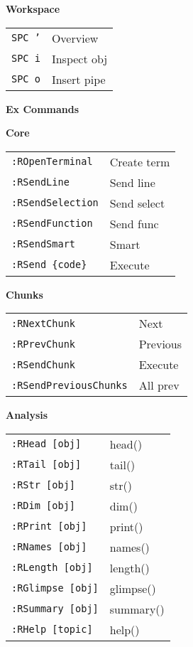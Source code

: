 \documentclass[10pt,a4paper]{article}
\begin{document}
\begin{multicols}{3}
\vspace{3pt}
\textbf{Workspace}\\
\begin{tabular}{@{}L{0.6cm}L{1.8cm}@{}}
\texttt{SPC '} & Overview \\
\texttt{SPC i} & Inspect obj \\
\texttt{SPC o} & Insert pipe \\
\end{tabular}

\columnbreak

\textbf{Ex Commands}

\textbf{Core}\\
\begin{tabular}{@{}L{1.5cm}L{1.3cm}@{}}
\texttt{:ROpenTerminal} & Create term \\
\texttt{:RSendLine} & Send line \\
\texttt{:RSendSelection} & Send select \\
\texttt{:RSendFunction} & Send func \\
\texttt{:RSendSmart} & Smart \\
\texttt{:RSend \{code\}} & Execute \\
\end{tabular}

\vspace{3pt}
\textbf{Chunks}\\
\begin{tabular}{@{}L{1.5cm}L{1.3cm}@{}}
\texttt{:RNextChunk} & Next \\
\texttt{:RPrevChunk} & Previous \\
\texttt{:RSendChunk} & Execute \\
\texttt{:RSendPreviousChunks} & All prev \\
\end{tabular}

\vspace{3pt}
\textbf{Analysis}\\
\begin{tabular}{@{}L{1.5cm}L{1.3cm}@{}}
\texttt{:RHead [obj]} & head() \\
\texttt{:RTail [obj]} & tail() \\
\texttt{:RStr [obj]} & str() \\
\texttt{:RDim [obj]} & dim() \\
\texttt{:RPrint [obj]} & print() \\
\texttt{:RNames [obj]} & names() \\
\texttt{:RLength [obj]} & length() \\
\texttt{:RGlimpse [obj]} & glimpse() \\
\texttt{:RSummary [obj]} & summary() \\
\texttt{:RHelp [topic]} & help() \\
\end{tabular}


\end{multicols}
\end{document}
